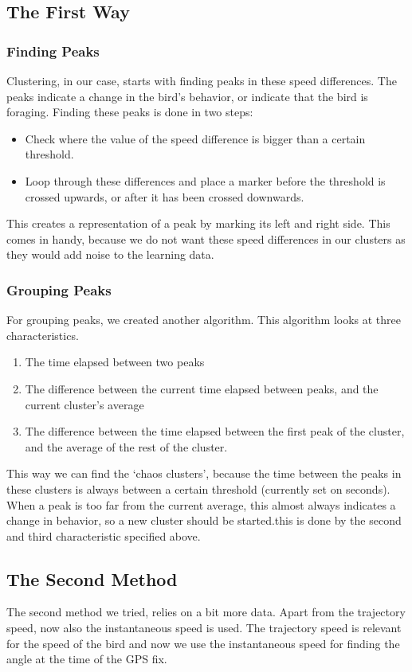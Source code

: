 \subsection{The First Way}
 \subsubsection{Finding Peaks}
 Clustering, in our case, starts with finding peaks in these speed differences.
 The peaks indicate a change in the bird's behavior, or indicate that the bird
 is foraging. Finding these peaks is done in two steps:

 \begin{itemize}
    \item Check where the value of the speed difference is bigger than a certain
    threshold.
    \item Loop through these differences and place a marker before the threshold
    is crossed upwards, or after it has been crossed downwards. 
 \end{itemize}
 
 This creates a representation of a peak by marking its left and right side.
 This comes in handy, because we do not want these speed differences in our
 clusters as they would add noise to the learning data.

 \subsubsection{Grouping Peaks}
 For grouping peaks, we created another algorithm. This algorithm looks at three
 characteristics.  
 \begin{enumerate}
 \item The time elapsed between two peaks
 \item The difference between the current time elapsed between peaks, and the
 current cluster's average
 \item The difference between the time elapsed between the first peak of the
 cluster, and the average of the rest of the cluster.
 \end{enumerate}
 This way we can find the `chaos clusters', because the time between the peaks
 in these clusters is always between a certain threshold (currently set on
 \timeThreshold seconds). 
 When a peak is too far from the  current average, this almost always indicates
 a change in behavior, so a new cluster should be started.this is done by the
 second and third characteristic specified above.

\subsection{The Second Method}
The second method we tried, relies on a bit more data. Apart from the trajectory
speed, now also the instantaneous speed is used. The trajectory speed is relevant for
the speed of the bird and now we use the instantaneous speed for finding the angle
at the time of the GPS fix. 

